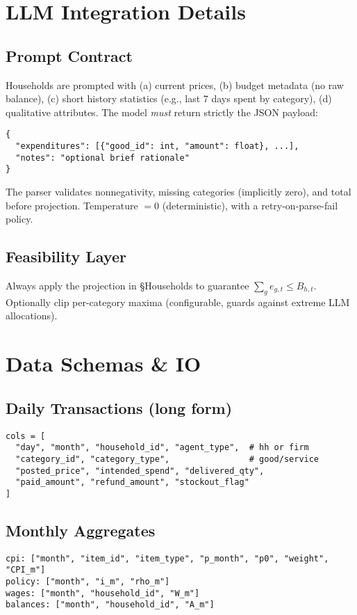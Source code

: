 \documentclass[12pt]{article}
\begin{document}
\section{LLM Integration Details}
\subsection*{Prompt Contract}
Households are prompted with (a) current prices, (b) budget metadata (no raw balance), (c) short history statistics (e.g., last 7 days spent by category), (d) qualitative attributes. The model \emph{must} return strictly the JSON payload:
\begin{verbatim}
{
  "expenditures": [{"good_id": int, "amount": float}, ...],
  "notes": "optional brief rationale"
}
\end{verbatim}
The parser validates nonnegativity, missing categories (implicitly zero), and total before projection. Temperature $=0$ (deterministic), with a retry-on-parse-fail policy.

\subsection*{Feasibility Layer}
Always apply the projection in \S\;Households to guarantee $\sum_g e_{g,t}\le B_{h,t}$.
Optionally clip per-category maxima (configurable, guards against extreme LLM allocations).

\section{Data Schemas \& IO}
\subsection*{Daily Transactions (long form)}
\begin{verbatim}
cols = [
  "day", "month", "household_id", "agent_type",  # hh or firm
  "category_id", "category_type",                # good/service
  "posted_price", "intended_spend", "delivered_qty",
  "paid_amount", "refund_amount", "stockout_flag"
]
\end{verbatim}

\subsection*{Monthly Aggregates}
\begin{verbatim}
cpi: ["month", "item_id", "item_type", "p_month", "p0", "weight", "CPI_m"]
policy: ["month", "i_m", "rho_m"]
wages: ["month", "household_id", "W_m"]
balances: ["month", "household_id", "A_m"]
\end{verbatim}
\end{document}

